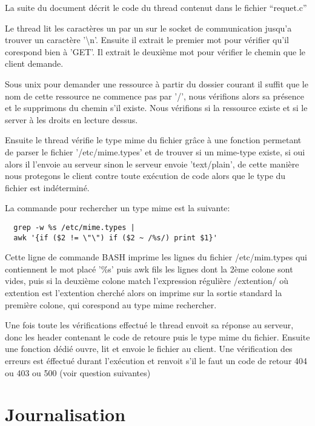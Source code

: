 \documentclass{report}
\begin{document}
La suite du document décrit le code du thread contenut dans le fichier ``requet.c''

Le thread lit les caractères un par un sur le socket de communication jusqu'a trouver un caractère '\textbackslash{}n'.
Ensuite il extrait le premier mot pour vérifier qu'il corespond bien à 'GET'.
Il extrait le deuxième mot pour vérifier le chemin que le client demande.

Sous unix pour demander une ressource à partir du dossier courant il suffit que le nom de cette ressource ne commence pas par '/', nous vérifions alors sa présence et le
supprimons du chemin s'il existe. Nous vérifions si la ressource existe et si le server à les droits en lecture dessus.\hbox{}

Ensuite le thread vérifie le type mime du fichier grâce à une fonction permetant de parser le fichier '/etc/mime.types' et de trouver si un mime-type existe, si oui alors
il l'envoie au serveur sinon le serveur envoie 'text/plain', de cette manière nous protegons le client contre toute exécution de code alors que le type du fichier est indéterminé.\hbox{}

La commande pour rechercher un type mime est la suivante: \hbox{}
\begin{lstlisting}
  grep -w %s /etc/mime.types |
  awk '{if ($2 != \"\") if ($2 ~ /%s/) print $1}'
\end{lstlisting}

Cette ligne de commande BASH imprime les lignes du fichier /etc/mim.types qui contiennent le mot placé '\%s' puis awk fils les lignes dont la 2ème colone sont vides, puis si la deuxième colone match l'expression régulière /extention/ où extention est l'extention cherché alors on imprime sur la sortie standard la première colone, qui corespond au type mime rechercher.\hbox{}

Une fois toute les vérifications effectué le thread envoit sa réponse au serveur, donc les header contenant le code de retoure puis le type mime du fichier.
Ensuite une fonction dédié ouvre, lit et envoie le fichier au client.
\hbox{}
Une vérification des erreurs est éffectué durant l'exécution et renvoit s'il le faut un code de retour 404 ou 403 ou 500 (voir question suivantes)

\section{Journalisation}
\end{document}
